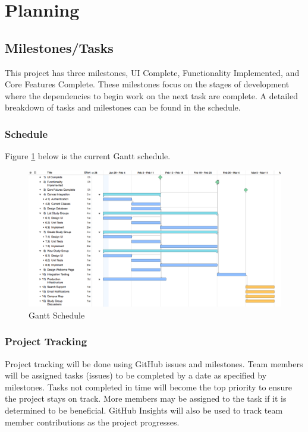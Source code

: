 \documentclass[12pt,letterpaper]{article}
\begin{document}
\section{Planning}
\subsection{Milestones/Tasks}
This project has three milestones, UI Complete, Functionality Implemented, and Core Features Complete. These milestones focus on the stages of development where the dependencies to begin work on the next task are complete. A detailed breakdown of tasks and milestones can be found in the schedule.

\clearpage
\subsubsection{Schedule}
Figure \ref{gantt} below is the current Gantt schedule.

\begin{figure}[h]
  \includegraphics[width=\linewidth]{StudyUp_Gantt.png}
  \caption{Gantt Schedule}
  \label{gantt}
\end{figure}

\subsubsection{Project Tracking}
Project tracking will be done using GitHub issues and milestones. Team members will be assigned tasks (issues) to be completed by a date as specified by milestones. Tasks not completed in time will become the top priority to ensure the project stays on track. More members may be assigned to the task if it is determined to be beneficial. GitHub Insights will also be used to track team member contributions as the project progresses.
\end{document}
